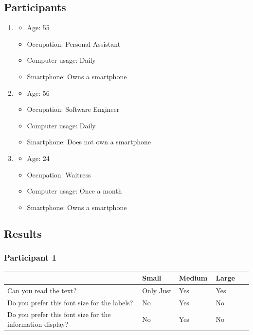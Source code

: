 \documentclass[11pt,english,numbers=endperiod,parskip=half]{scrartcl}
\begin{document}
\subsection{Participants}
\begin{enumerate}
	\item{
			\begin{itemize}
				\item{Age: 55}
				\item{Occupation: Personal Assistant}
				\item{Computer usage: Daily}
				\item{Smartphone: Owns a smartphone}
			\end{itemize}
		}
	\item{
			\begin{itemize}
				\item{Age: 56}
				\item{Occupation: Software Engineer}
				\item{Computer usage: Daily}
				\item{Smartphone: Does not own a smartphone}
			\end{itemize}
		}
	\item{
			\begin{itemize}
				\item{Age: 24}
				\item{Occupation: Waitress}
				\item{Computer usage: Once a month}
				\item{Smartphone: Owns a smartphone}
			\end{itemize}
		}
\end{enumerate}
\subsection{Results}
\subsubsection{Participant 1}
\begin{table}[H]
	\begin{tabular}{| p{0.55\linewidth} | p{0.15\linewidth} | p{0.15\linewidth} | p{0.15 \linewidth} |}
		\hline
			&	Small	&	Medium	&	Large \\ \hline
		Can you read the text?	& Only Just	& Yes	& Yes \\ \hline
		Do you prefer this font size for the labels? & No & Yes & No \\ \hline
		Do you prefer this font size for the information display? & No & Yes & No \\
		\hline
	\end{tabular}
\end{table}
\end{document}
